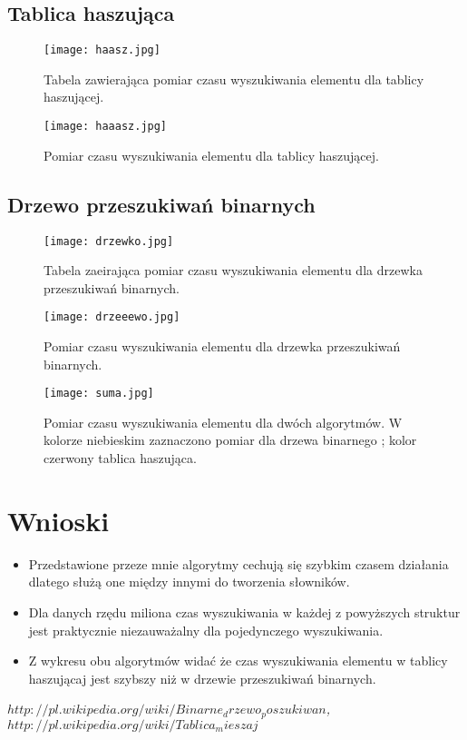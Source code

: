\documentclass[11pt]{article}
\begin{document}
\subsection{Tablica haszująca}


 
  \begin{figure}[ht!] 
\centering
 \texttt{[image: haasz.jpg]}
 \caption{Tabela zawierająca pomiar czasu wyszukiwania elementu dla tablicy haszującej. } 
\label{overflow}
 \end{figure}

 \begin{figure}[ht!] 
\centering
 \texttt{[image: haaasz.jpg]}
 \caption{Pomiar czasu wyszukiwania elementu dla tablicy haszującej. } 
\label{overflow}
 \end{figure}
 \newpage
\subsection{Drzewo przeszukiwań binarnych }

 
 \begin{figure}[ht!] 
\centering
 \texttt{[image: drzewko.jpg]}
 \caption{Tabela zaeirająca pomiar czasu wyszukiwania elementu dla drzewka przeszukiwań binarnych. } 
\label{overflow}
 \end{figure}

  \begin{figure}[ht!] 
\centering
 \texttt{[image: drzeeewo.jpg]}
 \caption{Pomiar czasu wyszukiwania elementu dla drzewka przeszukiwań binarnych. } 
\label{overflow}
 \end{figure}
 
   \begin{figure}[ht!] 
\centering
 \texttt{[image: suma.jpg]}
 \caption{Pomiar czasu wyszukiwania elementu dla dwóch algorytmów. W kolorze niebieskim zaznaczono pomiar dla drzewa binarnego ; kolor czerwony tablica haszująca. } 
\label{overflow}
 \end{figure}
 
\newpage
\section{Wnioski}
\begin{itemize}
\item Przedstawione przeze mnie algorytmy cechują się szybkim czasem działania dlatego służą one między innymi do tworzenia słowników.
\item Dla danych rzędu miliona czas wyszukiwania w każdej z powyższych struktur jest praktycznie niezauważalny dla pojedynczego wyszukiwania.
\item Z wykresu obu algorytmów widać że czas wyszukiwania elementu w tablicy haszującaj jest szybszy niż w drzewie przeszukiwań binarnych.
\end{itemize} 

\begin{thebibliography}{99}
\emph{$ http://pl.wikipedia.org/wiki/Binarne_drzewo_poszukiwan$,}
\emph{$http://pl.wikipedia.org/wiki/Tablica_mieszaj$}
\end{thebibliography}
\end{document}
